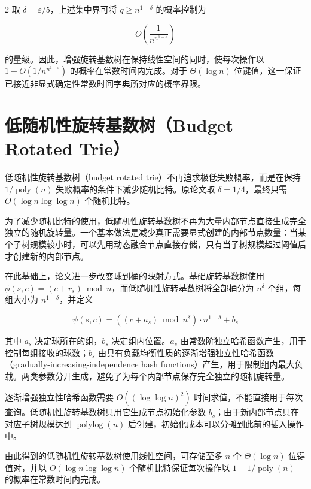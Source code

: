 \documentclass[10.5pt,compsoc,UTF8]{CjC}
\theoremstyle{mystyle}
\begin{document}
\begin{multicols}{2}
取 $\delta=\varepsilon/5$，上述集中界可将 $q\geq n^{1-\delta}$ 的概率控制为

\begin{equation}
O\left(\frac{1}{n^{n^{1-\varepsilon}}}\right)
\end{equation}

的量级。因此，增强旋转基数树在保持线性空间的同时，使每次操作以 $1-O(1/n^{n^{1-\varepsilon}})$ 的概率在常数时间内完成。对于 $\Theta(\log n)$ 位键值，这一保证已接近非显式确定性常数时间字典所对应的概率界限。

\section{\heiti 低随机性旋转基数树（Budget Rotated Trie）}

低随机性旋转基数树（budget rotated trie）不再追求极低失败概率，而是在保持 $1/\operatorname{poly}(n)$ 失败概率的条件下减少随机比特。原论文取 $\delta=1/4$，最终只需 $O(\log n\log\log n)$ 个随机比特。

为了减少随机比特的使用，低随机性旋转基数树不再为大量内部节点直接生成完全独立的随机旋转量。一个基本做法是减少真正需要显式创建的内部节点数量：当某个子树规模较小时，可以先用动态融合节点直接存储，只有当子树规模超过阈值后才创建新的内部节点。

在此基础上，论文进一步改变球到桶的映射方式。基础旋转基数树使用 $\phi(s,c)=(c+r_s)\bmod n$，而低随机性旋转基数树将全部桶分为 $n^\delta$ 个组，每组大小为 $n^{1-\delta}$，并定义

\begin{equation}
\psi(s,c)=((c+a_s)\bmod n^\delta)\cdot n^{1-\delta}+b_s
\end{equation}

其中 $a_s$ 决定球所在的组，$b_s$ 决定组内位置。$a_s$ 由常数阶独立哈希函数产生，用于控制每组接收的球数；$b_s$ 由具有负载均衡性质的逐渐增强独立性哈希函数（gradually-increasing-independence hash functions）产生，用于限制组内最大负载。两类参数分开生成，避免了为每个内部节点保存完全独立的随机旋转量。

逐渐增强独立性哈希函数需要 $O((\log\log n)^2)$ 时间求值，不能直接用于每次查询。低随机性旋转基数树只用它生成节点初始化参数 $b_s$；由于新内部节点只在对应子树规模达到 $\operatorname{polylog}(n)$ 后创建，初始化成本可以分摊到此前的插入操作中。

由此得到的低随机性旋转基数树使用线性空间，可存储至多 $n$ 个 $\Theta(\log n)$ 位键值对，并以 $O(\log n\log\log n)$ 个随机比特保证每次操作以 $1-1/\operatorname{poly}(n)$ 的概率在常数时间内完成。


\end{multicols}
\end{document}
